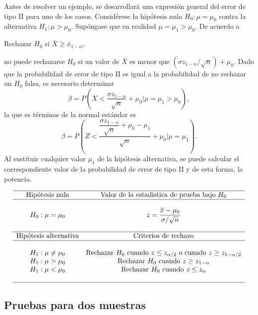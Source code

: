 Antes de resolver un ejemplo, se desarrollará una expresión general del error de tipo II para uno de los casos. Considérese la hipótesis nula $H_0:\mu=\mu_0$ contra la alternativa $H_1:\mu>\mu_0$. Supóngase que en realidad $\mu=\mu_1>\mu_0$. De acuerdo a 
\begin{center}
    Rechazar $H_0$ si $\overline{X}\geq \overline{x}_{1-\alpha},$
\end{center}
no puede rechazarse $H_0$ si un valor de $\overline{X}$ es menor que $(\sigma z_{1-\alpha}/\sqrt{n})+\mu_0$. Dado que la probabilidad de error de tipo II es igual a la probabilidad de no rechazar un $H_0$ falsa, es necesario determinar
$$\beta = P\left(\overline{X}<\dfrac{\sigma z_{1-\alpha}}{\sqrt{n}}+\mu_0 \bigg| \mu=\mu_1>\mu_0\right),$$
la que es términos de la normal estándar es
$$\beta = P\left(Z<\dfrac{\dfrac{\sigma z_{1-\alpha}}{\sqrt{n}}+\mu_0-\mu_1}{\sqrt{n}}+\mu_0 \Bigg| \mu=\mu_1\right).$$
Al sustituir cualquier valor $\mu_1$ de la hipótesis alternativa, se puede calcular el correspondiente valor de la probabilidad de error de tipo II y de esta forma, la potencia.

$$
\begin{array}{cc}
    \hline
    \mbox{Hipótesis nula} & \mbox{Valor de la estadística de prueba bajo } H_0\\
    \hline\\
    H_0: \mu=\mu_0 & z=\dfrac{\overline{x}-\mu_0}{\sigma/\sqrt{n}}\\\\
    \hline
    \mbox{Hipótesis alternativa} & \mbox{Criterios de rechazo}\\
    \hline\\
    H_1:\mu\neq \mu_0 & \mbox{Rechazar } H_0 \mbox{ cuando } z\leq z_{\alpha/2} \mbox{ o cuando } z\geq z_{1-\alpha/2}\\
    H_1:\mu> \mu_0 & \mbox{Rechazar } H_0 \mbox{ cuando } z\geq z_{1-\alpha}\\
    H_1:\mu< \mu_0 & \mbox{Rechazar } H_0 \mbox{ cuando } z\leq z_{\alpha}\\\\
    \hline
\end{array}
$$

\subsection{Pruebas para dos muestras}
